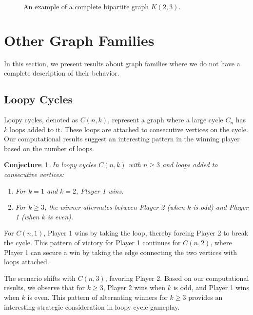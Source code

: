 \documentclass{article}
\newtheorem{conjecture}[theorem]{Conjecture}
\begin{document}
\begin{figure}[hbt!]
\centering
{}
\caption{An example of a complete bipartite graph $K(2, 3)$.}
\label{fig:k2n}
\end{figure}
\FloatBarrier

\section{Other Graph Families}

In this section, we present results about graph families where we do not have a complete description of their behavior. 

\subsection{Loopy Cycles}

Loopy cycles, denoted as $C(n,k)$, represent a graph where a large cycle $C_n$ has $k$ loops added to it. These loops are attached to consecutive vertices on the cycle. Our computational results suggest an interesting pattern in the winning player based on the number of loops.

\begin{conjecture}
In loopy cycles $C(n,k)$ with $n \geq 3$ and loops added to consecutive vertices:
\begin{enumerate}
    \item For $k = 1$ and $k = 2$, Player 1 wins.
    \item For $k \geq 3$, the winner alternates between Player 2 (when $k$ is odd) and Player 1 (when $k$ is even).
\end{enumerate}
\end{conjecture}

For $C(n,1)$, Player 1 wins by taking the loop, thereby forcing Player 2 to break the cycle. This pattern of victory for Player 1 continues for $C(n,2)$, where Player 1 can secure a win by taking the edge connecting the two vertices with loops attached.

The scenario shifts with $C(n,3)$, favoring Player 2. Based on our computational results, we observe that for $k \geq 3$, Player 2 wins when $k$ is odd, and Player 1 wins when $k$ is even. This pattern of alternating winners for $k \geq 3$ provides an interesting strategic consideration in loopy cycle gameplay.
\end{document}
